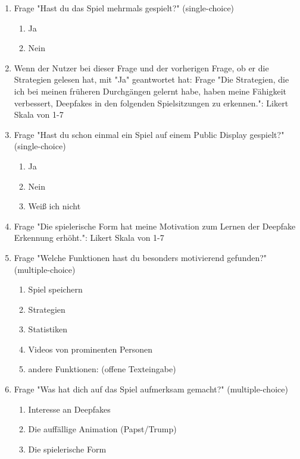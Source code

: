 \begin{enumerate}
\begin{enumerate} [label=\alph*)]
        \item Sonstiges: (offene Texteingabe)
    \end{enumerate}
    \item Frage "Hast du das Spiel mehrmals gespielt?" (single-choice)
    \begin{enumerate} [label=\alph*)]
        \item Ja 
        \item Nein 
    \end{enumerate}
    \item Wenn der Nutzer bei dieser Frage und der vorherigen Frage, 
        ob er die Strategien gelesen hat, mit "Ja" geantwortet hat: 
        Frage "Die Strategien, die ich bei meinen früheren Durchgängen gelernt habe, 
        haben meine Fähigkeit verbessert, Deepfakes in den folgenden Spielsitzungen zu erkennen.":
		Likert Skala von 1-7 
    \item Frage "Hast du schon einmal ein Spiel auf einem Public Display gespielt?" (single-choice)
    \begin{enumerate} [label=\alph*)]
        \item Ja 
        \item Nein 
        \item Weiß ich nicht 
    \end{enumerate}
    \item Frage "Die spielerische Form hat meine Motivation zum Lernen der Deepfake Erkennung erhöht.":
	    Likert Skala von 1-7
    \item Frage "Welche Funktionen hast du besonders motivierend gefunden?" (multiple-choice)
    \begin{enumerate} [label=\alph*)]
        \item Spiel speichern 
        \item Strategien 
        \item Statistiken 
        \item Videos von prominenten Personen 
        \item andere Funktionen: (offene Texteingabe)
    \end{enumerate}
    \item Frage "Was hat dich auf das Spiel aufmerksam gemacht?" (multiple-choice)
    \begin{enumerate} [label=\alph*)]
        \item Interesse an Deepfakes
        \item Die auffällige Animation (Papst/Trump)
        \item Die spielerische Form

\end{enumerate}
\end{enumerate}
